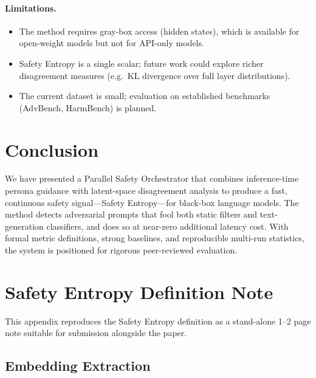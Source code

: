 \documentclass[12pt,a4paper]{article}
\begin{document}
\paragraph{Limitations.}
\begin{itemize}[nosep]
  \item The method requires gray-box access (hidden states), which is
        available for open-weight models but not for API-only models.
  \item Safety Entropy is a single scalar; future work could explore
        richer disagreement measures (e.g.\ KL divergence over full
        layer distributions).
  \item The current dataset is small; evaluation on established
        benchmarks (AdvBench, HarmBench) is planned.
\end{itemize}


\section{Conclusion}
\label{sec:conclusion}

We have presented a Parallel Safety Orchestrator that combines
inference-time persona guidance with latent-space disagreement analysis
to produce a fast, continuous safety signal---Safety Entropy---for
black-box language models.  The method detects adversarial prompts that
fool both static filters and text-generation classifiers, and does so at
near-zero additional latency cost.  With formal metric definitions,
strong baselines, and reproducible multi-run statistics, the system is
positioned for rigorous peer-reviewed evaluation.


\appendix
\section{Safety Entropy Definition Note}
\label{app:entropy_note}

This appendix reproduces the Safety Entropy definition as a stand-alone
1--2 page note suitable for submission alongside the paper.

\subsection*{Embedding Extraction}
\end{document}
